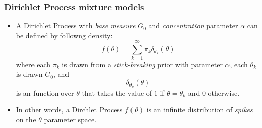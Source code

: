 \documentclass{slides}
\begin{document}
\begin{frame}
	\frametitle{Dirichlet Process mixture models}
	\begin{itemize}
		\item A Dirichlet Process with \emph{base measure} $G_0$ and \emph{concentration} parameter $\alpha$ can be defined by followng density:
			\[
				f(\theta) = \sum_{k=1}^\infty \pi_k \delta_{\theta_k}(\theta)
			\]
			where each $\pi_k$ is drawn from a \emph{stick-breaking} prior with parameter $\alpha$, each $\theta_k$ is drawn $G_0$, and 
		\[
			\delta_{\theta_k}(\theta)
		\]
		is an function over $\theta$ that takes the value of $1$ if $\theta=\theta_k$ and $0$ otherwise.
		\item In other words, a Dirchlet Process $f(\theta)$ is an infinite distribution of \emph{spikes} on the $\theta$ parameter space.


	\end{itemize}
\end{frame}
\end{document}
